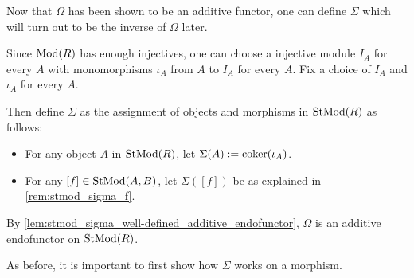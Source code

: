 Now that \( \Omega \) has been shown to be an additive functor, one can define \( \Sigma \) which will turn out to be the inverse of \( \Omega \) later.

\begin{definition}
    \label{def:stmod_sigma}
    Since \( \operatorname{Mod}(R) \) has enough injectives, one can choose a injective module \( I_A \) for every \( A \) with monomorphisms \( \iota_A \) from \( A \) to \( I_A \) for every \( A \). Fix a choice of \( I_A \) and \( \iota_A \) for every \( A \).

    Then define \( \Sigma \) as the assignment of objects and morphisms in \( \operatorname{StMod}(R) \) as follows:
    \begin{itemize}
        \item For any object \( A \) in \( \operatorname{StMod}(R) \), let \( \Sigma(A) := \operatorname{coker}(\iota_A) \).
        \item For any \( [f] \in \operatorname{StMod}(A, B) \), let \( \Sigma([f]) \) be as explained in \autoref{rem:stmod_sigma_f}.
    \end{itemize}

    By \autoref{lem:stmod_sigma_well-defined_additive_endofunctor}, \( \Omega \) is an additive endofunctor on \( \operatorname{StMod}(R) \).
\end{definition}

As before, it is important to first show how \( \Sigma \) works on a morphism.

